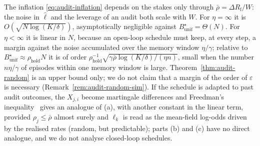 \begin{remark}\label{rem:audit-random}
The inflation \eqref{eq:audit-inflation} depends on the stakes only through
$\bar\rho=\Delta R_{\mathrm f}/W$: the noise in $\hat\ell$ and the leverage of an audit both
scale with $W$. For $\eta=\infty$ it is $O(\sqrt{N\log(K/\delta)})$, asymptotically negligible
against $B^\star_{\mathrm{unif}}=\Theta(N)$. For $\eta<\infty$ it is linear in
$N$, because an open-loop schedule must keep, at every step, a margin against
the noise accumulated over the memory window $\eta/\gamma$; relative to
$B^\star_{\mathrm{unif}}\approx\rho_{\mathrm{hold}}N$ it is of order
$\rho_{\mathrm{hold}}^{-1}\sqrt{\gamma\bar\rho\log(K/\delta)/(\eta n)}$, small
when the number $n\eta/\gamma$ of episodes within one memory window is large.
Theorem~\ref{thm:audit-random} is an upper bound only; we do not claim that a
margin of the order of $\varepsilon$ is necessary
(Remark~\ref{rem:audit-random-sim}). If the schedule is adapted to past audit outcomes, the
$X_{j,i}$ become martingale differences and Freedman's
inequality~\cite{freedman1975tail} gives an analogue of (a), with another constant in the linear term, provided $\rho_j\le\bar\rho$ almost surely and $\ell_k$ is read as the mean-field log-odds driven by the realised rates (random, but predictable); parts (b) and (c) have no direct analogue, and we do not analyse closed-loop schedules.
\end{remark}
